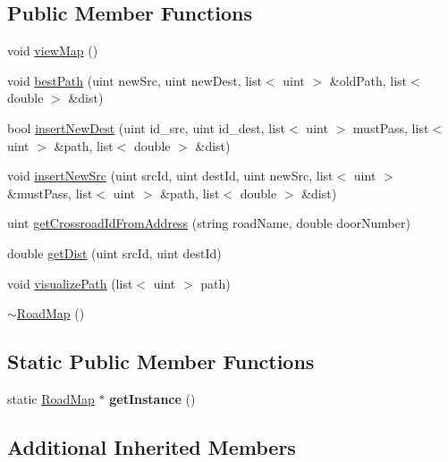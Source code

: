\subsection*{Public Member Functions}
\begin{DoxyCompactItemize}
\item 
void \hyperlink{class_road_map_a8783164e6e3f029e2ca1bac4ee620db5}{view\+Map} ()
\item 
void \hyperlink{class_road_map_a51dda1085cb948aef5593530223aa202}{best\+Path} (uint new\+Src, uint new\+Dest, list$<$ uint $>$ \&old\+Path, list$<$ double $>$ \&dist)
\item 
bool \hyperlink{class_road_map_a6e25c8aefc49316e95c3eb3111d06151}{insert\+New\+Dest} (uint id\+\_\+src, uint id\+\_\+dest, list$<$ uint $>$ must\+Pass, list$<$ uint $>$ \&path, list$<$ double $>$ \&dist)
\item 
void \hyperlink{class_road_map_a00a0a45209179dae49cebd1c50908dd6}{insert\+New\+Src} (uint src\+Id, uint dest\+Id, uint new\+Src, list$<$ uint $>$ \&must\+Pass, list$<$ uint $>$ \&path, list$<$ double $>$ \&dist)
\item 
uint \hyperlink{class_road_map_aca51fa3ea3ae51d9790f186092fe9a29}{get\+Crossroad\+Id\+From\+Address} (string road\+Name, double door\+Number)
\item 
double \hyperlink{class_road_map_a9970c4e809908d7a3784b23666ec5d10}{get\+Dist} (uint src\+Id, uint dest\+Id)
\item 
void \hyperlink{class_road_map_a700ada8d9925f1322804e0d08a007ff1}{visualize\+Path} (list$<$ uint $>$ path)
\item 
\hyperlink{class_road_map_a4945159808914eb623e1abb3b9b63306}{$\sim$\+Road\+Map} ()
\end{DoxyCompactItemize}
\subsection*{Static Public Member Functions}
\begin{DoxyCompactItemize}
\item 
\hypertarget{class_road_map_ad106d7b921a092b9375682a5ec475fae}{}static \hyperlink{class_road_map}{Road\+Map} $\ast$ {\bfseries get\+Instance} ()\label{class_road_map_ad106d7b921a092b9375682a5ec475fae}

\end{DoxyCompactItemize}
\subsection*{Additional Inherited Members}


